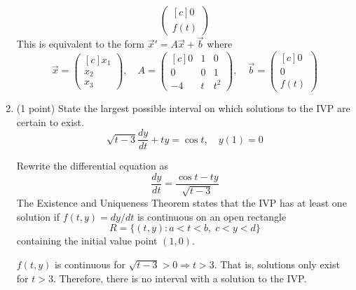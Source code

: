 \documentclass[11pt, titlepage]{article}
\begin{document}
\begin{enumerate}
\begin{solution}
\begin{equation*}
\begin{pmatrix*}[c]
          0 \\
          f(t)
        \end{pmatrix*}
      \end{equation*}
      This is equivalent to the form \(\vec{x}' = A \vec{x} + \vec{b}\) where
      \begin{equation*}
        \vec{x} =
        \begin{pmatrix*}[c]
          x_{1} \\
          x_{2} \\
          x_{3}
        \end{pmatrix*}, \quad
        A =
        \begin{pmatrix*}[c]
          0 & 1 & 0 \\
          0 & 0 & 1 \\
          -4 & t & t^{2}
        \end{pmatrix*}, \quad
        \vec{b} =
        \begin{pmatrix*}[c]
          0 \\
          0 \\
          f(t)
        \end{pmatrix*}
      \end{equation*}
    \end{solution}

    \pagebreak

    \item (1 point) State the largest possible interval on which solutions to the IVP are certain to exist.
    \begin{equation*}
      \sqrt{t - 3} \frac{dy}{dt} + ty = \cos t, \quad y(1) = 0
    \end{equation*}

    \begin{solution}
      Rewrite the differential equation as
      \begin{equation*}
        \frac{dy}{dt} = \frac{\cos t - ty}{\sqrt{t - 3}}
      \end{equation*}
      The Existence and Uniqueness Theorem states that the IVP has at least one solution if
      \(f(t, y) = dy / dt\) is continuous on an open rectangle
      \begin{equation*}
        R = \{(t, y) : a < t < b, \; c < y < d\}
      \end{equation*}
      containing the initial value point \((1, 0)\).

      \(f(t, y)\) is continuous for \(\sqrt{t - 3} > 0 \Longrightarrow t > 3\). That is, solutions only exist for \(t > 3\).
      Therefore, there is no interval with a solution to the IVP.
    \end{solution}


\end{enumerate}
\end{document}
